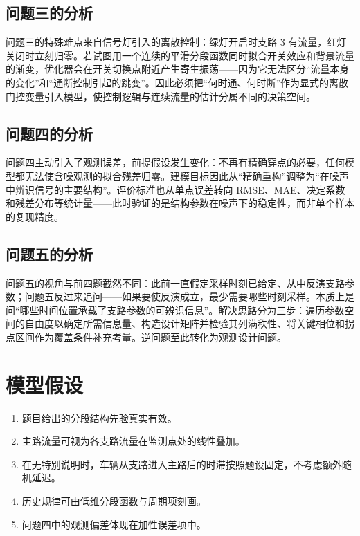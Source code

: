 \documentclass[UTF8,a4paper,fontset=none]{ctexart}
\numberwithin{equation}{section}
\begin{document}
\subsection{问题三的分析}
问题三的特殊难点来自信号灯引入的离散控制：绿灯开启时支路 3 有流量，红灯关闭时立刻归零。若试图用一个连续的平滑分段函数同时拟合开关效应和背景流量的渐变，优化器会在开关切换点附近产生寄生振荡——因为它无法区分``流量本身的变化''和``通断控制引起的跳变''。因此必须把``何时通、何时断''作为显式的离散门控变量引入模型，使控制逻辑与连续流量的估计分属不同的决策空间\cite{refSignal1}。

\subsection{问题四的分析}
问题四主动引入了观测误差，前提假设发生变化：不再有精确穿点的必要，任何模型都无法使含噪观测的拟合残差归零。建模目标因此从``精确重构''调整为``在噪声中辨识信号的主要结构''。评价标准也从单点误差转向 RMSE、MAE、决定系数和残差分布等统计量——此时验证的是结构参数在噪声下的稳定性，而非单个样本的复现精度\cite{refRobust1}。

\subsection{问题五的分析}
问题五的视角与前四题截然不同：此前一直假定采样时刻已给定、从中反演支路参数；问题五反过来追问——如果要使反演成立，最少需要哪些时刻采样。本质上是问``哪些时间位置承载了支路参数的可辨识信息''。解决思路分为三步：遍历参数空间的自由度以确定所需信息量、构造设计矩阵并检验其列满秩性、将关键相位和拐点区间作为覆盖条件补充考量。逆问题至此转化为观测设计问题\cite{refSensor1,refSensor3,refSensor6}。

\section{模型假设}
\begin{enumerate}[itemsep=0pt,topsep=2pt,parsep=0pt,partopsep=0pt]
  \item 题目给出的分段结构先验真实有效。
  \item 主路流量可视为各支路流量在监测点处的线性叠加。
  \item 在无特别说明时，车辆从支路进入主路后的时滞按照题设固定，不考虑额外随机延迟。
  \item 历史规律可由低维分段函数与周期项刻画。
  \item 问题四中的观测偏差体现在加性误差项中。
\end{enumerate}
\end{document}
